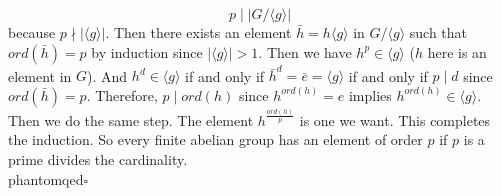 \documentclass[12pt]{amsart}
\begin{document}
    \[p\mid |G/\langle g\rangle|\]
    because $p\nmid |\langle g\rangle|$. Then there exists an element $\bar{h}=h\langle g\rangle$ in $G/\langle g\rangle$ such that $ord(\bar{h})=p$ by induction since $|\langle g\rangle|>1$. Then we have $h^p\in\langle g\rangle$ ($h$ here is an element in $G$). And $h^d\in \langle g\rangle$ if and only if $\bar{h}^d=\bar{e}=\langle g\rangle$ if and only if $p\mid d$ since $ord(\bar{h})=p$. Therefore, $p\mid ord(h)$ since $h^{ord(h)}=e$ implies $h^{ord(h)}\in \langle g\rangle$. Then we do the same step. The element $h^{\frac{ord(h)}{p}}$ is one we want. This completes the induction. So every finite abelian group has an element of order $p$ if $p$ is a prime divides the cardinality.
    \\phantom{qed}\hfill$\square$\\
\end{document}
